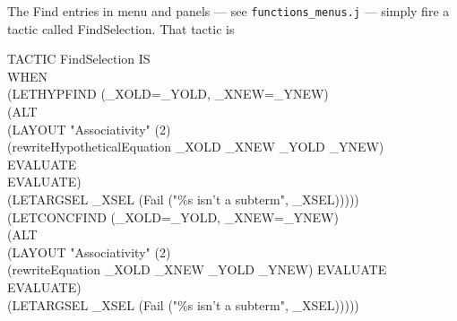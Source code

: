 The Find entries in menu and panels --- see \texttt{functions\_menus.j} --- simply fire a tactic called FindSelection. That tactic is
\begin{japeish}
TACTIC FindSelection IS \\
\tab WHEN  \\
\tab\tab (LETHYPFIND (\_XOLD=\_YOLD, \_XNEW=\_YNEW) \\
\tab\tab\tab (ALT  \\
\tab\tab\tab\tab (LAYOUT "Associativity" (2) \\
\tab\tab\tab\tab\tab (rewriteHypotheticalEquation \_XOLD \_XNEW \_YOLD \_YNEW) \\
\tab\tab\tab\tab\tab EVALUATE \\
\tab\tab\tab\tab\tab EVALUATE) \\
\tab\tab\tab\tab (LETARGSEL \_XSEL (Fail ("\%s isn't a subterm", \_XSEL))))) \\
\tab\tab (LETCONCFIND (\_XOLD=\_YOLD, \_XNEW=\_YNEW) \\
\tab\tab\tab (ALT \\
\tab\tab\tab\tab (LAYOUT "Associativity" (2) \\
\tab\tab\tab\tab\tab (rewriteEquation \_XOLD \_XNEW \_YOLD \_YNEW) EVALUATE EVALUATE) \\
\tab\tab\tab\tab (LETARGSEL \_XSEL (Fail ("\%s isn't a subterm", \_XSEL))))) \\
\end{japeish}

